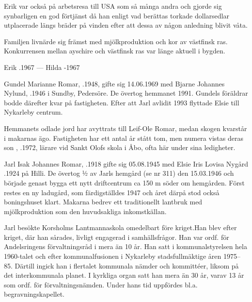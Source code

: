 Erik var också på arbetsresa till USA som så många andra och gjorde sig synbarligen en god förtjänst då han enligt vad berättas torkade
dollarsedlar utplacerade längs bräder på vinden efter att dessa av någon anledning blivit våta.

Familjen livnärde sig främst med mjölkproduktion och kor av västfinsk ras. Konkurrensen mellan ayschire och västfinsk ras var länge aktuell i bygden.

Erik .1967  ---  Hilda -1967



%



%
Gundel Marianne Romar, .1948, gifte sig 14.06.1969 med Bjarne Johannes Nylund, .1946 i Sundby, Pedersöre. De övertog hemmanet 1991. Gundels föräldrar bodde därefter kvar på fastigheten. Efter att Jarl avlidit 1993 flyttade Elsie till Nykarleby centrum.

Hemmanets odlade jord har avyttrats till Leif-Ole Romar, medan skogen kvarstår i makarnas ägo. Fastigheten har ett antal år stått tom, men numera vistas deras son , .1972, lärare vid Sankt Olofs skola i  Åbo, ofta här under sina ledigheter.


%
Jarl Isak Johannes Romar, .1918 gifte sig 05.08.1945 med Elsie Iris Lovisa Nygård .1924 på Hilli. De övertog ½ av Jarls hemgård (se nr 311) den 15.03.1946 och började genast bygga ett nytt driftcentrum ca 150 m söder om hemgården. Först restes en ny ladugård, som färdigställdes 1947 och året därpå stod också boningshuset klart. Makarna bedrev ett traditionellt lantbruk med mjölkproduktion som den huvudsakliga inkomstkällan.

Jarl besökte Korsholms Lantmannaskola omedelbart före kriget.Han blev efter kriget, där han sårades, livligt engagerad i samhällsfrågor. Han var ordf. för Andelsringens förvaltningsråd i mera än 10 år. Han satt i kommunalstyrelsen hela 1960-talet och efter kommunalfusionen i Nykarleby stadsfullmäktige åren 1975--85. Därtill ingick han i flertalet kommunala nämder och kommittéer, liksom på det interkommunala planet. I kyrkliga organ satt han mera än 30 år, varav 13 år som ordf. för förvaltningsnämden. Under hans tid uppfördes bl.a. begravningskapellet.

